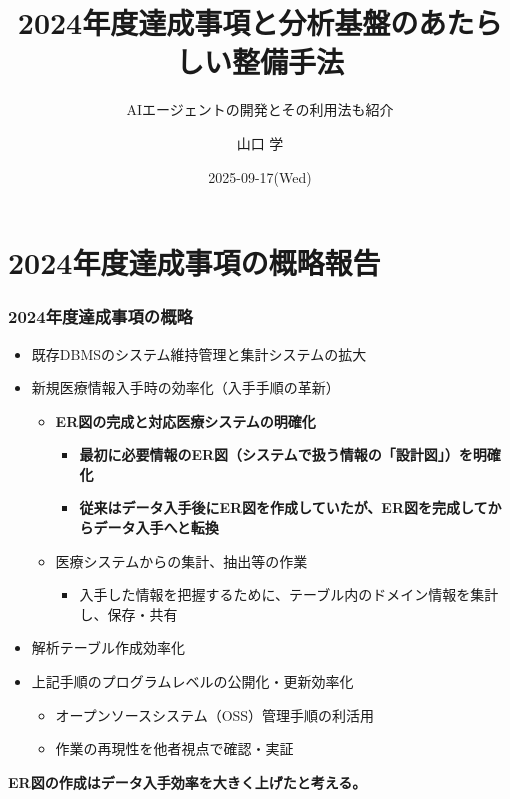 \documentclass[uplatex,dvipdfmx,9pt,a4paper]{beamer}
\begin{document}
\begin{frame}%
  \title{2024年度達成事項と分析基盤のあたらしい整備手法}
  \subtitle{AIエージェントの開発とその利用法も紹介}
  \author{山口 学}
  \date[]{2025-09-17(Wed)}
  \maketitle
\end{frame}

\section{2024年度達成事項の概略報告}

\begin{frame}%
  \frametitle{2024年度達成事項の概略}

\begin{itemize}
  \item 既存DBMSのシステム維持管理と集計システムの拡大
  \pause
  \item 新規医療情報入手時の効率化（入手手順の革新）
  \begin{itemize}
    \item \textbf{ER図の完成と対応医療システムの明確化}
    \pause
    \begin{itemize}
      \item \textbf{最初に必要情報のER図（システムで扱う情報の「設計図」）を明確化}
      \item \textbf{従来はデータ入手後にER図を作成していたが、ER図を完成してからデータ入手へと転換}
      \pause
    \end{itemize}
    \item 医療システムからの集計、抽出等の作業
    \begin{itemize}
      \item 入手した情報を把握するために、テーブル内のドメイン情報を集計し、保存・共有
      \pause
    \end{itemize}
  \end{itemize}
  \item 解析テーブル作成効率化
  \item 上記手順のプログラムレベルの公開化・更新効率化
  \begin{itemize}
    \item オープンソースシステム（OSS）管理手順の利活用
    \item 作業の再現性を他者視点で確認・実証
  \end{itemize}
\end{itemize}
\vspace{0.5cm}

\textbf{ER図の作成はデータ入手効率を大きく上げたと考える。}

\end{frame}
\end{document}
